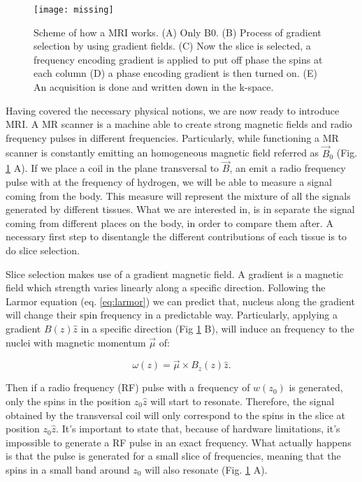 \begin{figure}[t]
    \texttt{[image: missing]}
    \caption{Scheme of how a MRI works. (A) Only B0. (B) Process of gradient selection by
             using gradient fields. (C) Now the slice is selected, a frequency
             encoding gradient is applied to put off phase the spins at each
             column (D) a phase encoding gradient is then turned on. (E) An
             acquisition is done and written down in the k-space.}
     \label{fig:mri}
\end{figure}

Having covered the necessary physical notions, we are now ready to introduce
MRI. A MR scanner is a machine able to create strong magnetic fields and radio
frequency pulses in different frequencies. Particularly, while functioning
a MR scanner is constantly emitting an homogeneous magnetic field referred as $\vec B_0$
(Fig. \ref{fig:mri} A). If we place a coil in the plane transversal to $\vec B$,
an emit a radio frequency pulse with at the frequency of hydrogen, we will be
able to measure a signal coming from the body. This measure will represent the
mixture of all the signals generated by different tissues. What we are interested
in, is in separate the signal coming from different places on the body, in order
to compare them after. A necessary first step to disentangle the different
contributions of each tissue is to do slice selection. 

Slice selection makes use of a gradient magnetic field. A gradient is a magnetic
field which strength varies linearly along a specific direction. Following the
Larmor equation (eq. \ref{eq:larmor}) we can predict that, nucleus along the
gradient will change their spin frequency in a predictable way. Particularly,
applying a gradient $B(z) \hat z$ in a specific direction (Fig \ref{fig:mri} B),
will induce an frequency to the nuclei with magnetic momentum $\vec \mu$ of:

\begin{equation}
\label{eq:gradient}
    \omega(z) = \vec \mu \times B_z(z) \hat z.
\end{equation}

Then if a radio frequency (RF) pulse with a frequency of $w(z_0)$ is generated,
only the spins in the position $z_0 \hat z$ will start to resonate. Therefore,
the signal obtained by the transversal coil will only correspond to the spins in
the slice at position $z_0 \hat z $. It's important to state that, because of
hardware limitations, it's impossible to generate a RF pulse in an exact frequency.
What actually happens is that the pulse is generated for a small slice of
frequencies, meaning that the spins in a small band around $z_0$ will also
resonate (Fig. \ref{fig:mri} A).

